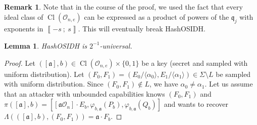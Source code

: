 \documentclass[a4paper,10pt,notitlepage]{report}
\theoremstyle{definition}
\theoremstyle{plain}
\newtheorem{Lemma}[Definition]{Lemma}
\theoremstyle{definition}
\newtheorem{Remark}[Definition]{Remark}
\newcommand{\mO}{\mathcal{O}}
\renewcommand{\i}[2]{\left\llbracket #1~;~#2\right\rrbracket}
\renewcommand{\(}{\left(}
\renewcommand{\)}{\right)}
\newcommand{\mf}[1]{\mathfrak{#1}}
\DeclareMathOperator{\Cl}{Cl}
\begin{document}
\begin{Remark}
Note that in the course of the proof, we used the fact that every ideal class of $\Cl(\mO_{n,e})$ can be expressed as a product of powers of the $\mf{q}_j$ with exponents in $\i{-s}{s}$.  This will eventually break HashOSIDH.
\end{Remark}

\begin{Lemma}
HashOSIDH is $2^{-1}$-universal.
\end{Lemma}

\begin{proof}
Let $([\mf{a}],b)\in \Cl(\mO_{n,e})\times\{0,1\}$ be a key (secret and sampled with uniform distribution). Let $(F_0,F_1)=(E_0/\langle\alpha_0\rangle, E_1/\langle\alpha_1\rangle)\in \Sigma\setminus L$ be sampled with uniform distribution.  Since $(F_0,F_1)\not\in L$, we have $\alpha_0\neq\alpha_1$. Let us assume that an attacker with unbounded capabilities knows $(F_0,F_1)$ and $\pi([\mf{a}],b)=[[\mf{a}\mO_n]\cdot E_b, \varphi_{b,\mf{a}}(P_b),\varphi_{b,\mf{a}}(Q_b)]$ and wants to recover $\Lambda(([\mf{a}],b),(F_0,F_1))=\mf{a}\cdot F_b$.  


\end{proof}
\end{document}
